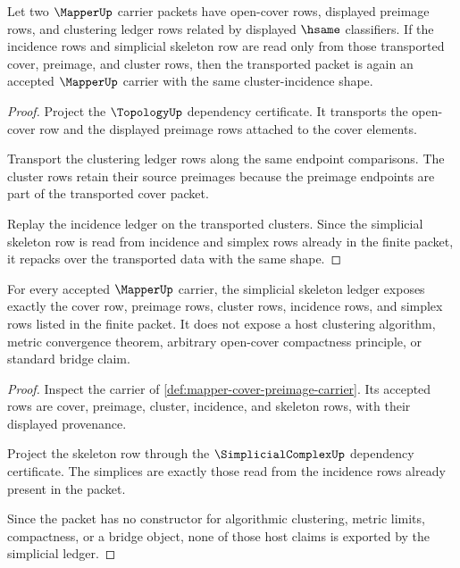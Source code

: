 \begin{theorem}
\label{thm:mapper-cluster-classifier-stability}
Let two $\MapperUp$ carrier packets have open-cover rows, displayed preimage
rows, and clustering ledger rows related by displayed $\hsame$ classifiers. If
the incidence rows and simplicial skeleton row are read only from those
transported cover, preimage, and cluster rows, then the transported packet is
again an accepted $\MapperUp$ carrier with the same cluster-incidence shape.
\end{theorem}
\begin{proof}
Project the $\TopologyUp$ dependency certificate. It transports the open-cover
row and the displayed preimage rows attached to the cover elements.

Transport the clustering ledger rows along the same endpoint comparisons. The
cluster rows retain their source preimages because the preimage endpoints are
part of the transported cover packet.

Replay the incidence ledger on the transported clusters. Since the simplicial
skeleton row is read from incidence and simplex rows already in the finite
packet, it repacks over the transported data with the same shape.
\end{proof}

\begin{theorem}
\label{thm:mapper-simplicial-ledger-exactness}
For every accepted $\MapperUp$ carrier, the simplicial skeleton ledger exposes
exactly the cover row, preimage rows, cluster rows, incidence rows, and simplex
rows listed in the finite packet. It does not expose a host clustering
algorithm, metric convergence theorem, arbitrary open-cover compactness
principle, or standard bridge claim.
\end{theorem}
\begin{proof}
Inspect the carrier of \autoref{def:mapper-cover-preimage-carrier}. Its
accepted rows are cover, preimage, cluster, incidence, and skeleton rows, with
their displayed provenance.

Project the skeleton row through the $\SimplicialComplexUp$ dependency
certificate. The simplices are exactly those read from the incidence rows
already present in the packet.

Since the packet has no constructor for algorithmic clustering, metric limits,
compactness, or a bridge object, none of those host claims is exported by the
simplicial ledger.
\end{proof}

